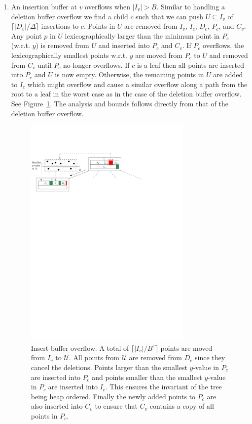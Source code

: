 \documentclass[twoside,11pt,openright]{report}
\def \epsilon {\varepsilon}
\begin{document}
\begin{enumerate}[label=(\roman*)]
	\item\label{update:ins} An insertion buffer at $v$ overflows when $\vert I_v \vert > B$. Similar to handling a deletion buffer overflow we find a child $c$ such that we can push $U \subseteq I_v$ of $\lceil \vert D_v \vert / \Delta \rceil$ insertions to $c$. Points in $U$ are removed from $I_v$, $I_c$, $D_c$, $P_c$, and $C_v$.
	Any point $p$ in $U$ lexicographically larger than the minimum point in $P_c$ (w.r.t. $y$) is removed from $U$ and inserted into $P_c$ and $C_v$.
	If $P_c$ overflows, the lexicographically smallest points w.r.t. $y$ are moved from $P_c$ to $U$ and removed from $C_v$ until $P_c$ no longer overflows.
	If $c$ is a leaf then all points are inserted into $P_c$ and $U$ is now empty.
	Otherwise, the remaining points in $U$ are added to $I_c$ which might overflow and cause a similar overflow along a path from the root to a leaf in the worst case as in the case of the deletion buffer overflow. See Figure~\ref{fig:brodal_insert_buffer_overflow}. The analysis and bounds follows directly from that of the deletion buffer overflow.
	
	\begin{figure}[b]
		\centering
		\includegraphics[width=0.77\textwidth]{../figures/brodal_insert_buffer_overflow}
		\caption{Insert buffer overflow. A total of $\lceil \lvert I_v \rvert /B^\epsilon \rceil$ points are moved from $I_v$ to $\mathcal{U}$. All points from $\mathcal{U}$ are removed from $D_c$ since they cancel the deletions. Points larger than the smallest $y$-value in $P_c$ are inserted into $P_c$ and points smaller than the smallest $y$-value in $P_c$ are inserted into $I_c$. This ensures the invariant of the tree being heap ordered. Finally the newly added points to $P_c$ are also inserted into $C_v$ to ensure that $C_v$ contains a copy of all points in $P_c$.}
		\label{fig:brodal_insert_buffer_overflow}
	\end{figure}		
	

\end{enumerate}
\end{document}
